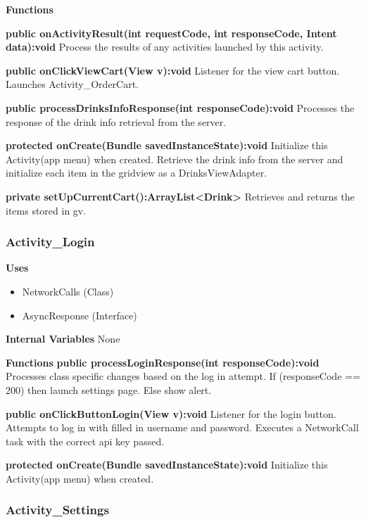 \documentclass [10pt]{article}
\begin{document}
\textbf{Functions}

\textbf{public onActivityResult(int requestCode, int responseCode, Intent data):void}
Process the results of any activities launched by this activity.

\textbf{public onClickViewCart(View v):void}
Listener for the view cart button. Launches Activity\_OrderCart.

\textbf{public processDrinksInfoResponse(int responseCode):void}
Processes the response of the drink info retrieval from the server.

\textbf{protected onCreate(Bundle savedInstanceState):void}
Initialize this Activity(app menu) when created. Retrieve the drink info from the server and initialize each item in the gridview as a DrinksViewAdapter. 

\textbf{private setUpCurrentCart():ArrayList<Drink>}
Retrieves and returns the items stored in gv.


\subsubsection{Activity\_Login}

\textbf{Uses}

\begin{itemize}
	\item NetworkCalls (Class)
	\item AsyncResponse (Interface)
\end{itemize}

\textbf{Internal Variables} None

\textbf{Functions}
\textbf{public processLoginResponse(int responseCode):void}
Processes class specific changes based on the log in attempt. If (responseCode == 200) then launch settings page. Else show alert.

\textbf{public onClickButtonLogin(View v):void}
Listener for the login button. Attempts to log in with filled in username and password. Executes a NetworkCall task with the correct api key passed.

\textbf{protected onCreate(Bundle savedInstanceState):void}
Initialize this Activity(app menu) when created.


\subsubsection{Activity\_Settings}
\end{document}
